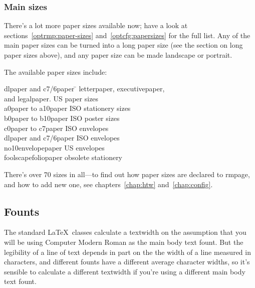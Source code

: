 \documentclass[11pt,loose,twoside,touchwider,longish,
                      noheaders,a4paper,notstdmargins]{report}
\DeclareRobustCommand*{\comname}[1]{{\ttfamily\makeatletter\bs #1\makeatother}}
\newcommand*{\classname}[1]{{\ttfamily #1}}
\newcommand*{\optname}[1]{{\ttfamily #1}}
\newcommand*{\rmpage}{\classname{rmpage}\xspace}
\begin{document}
\subsubsection{Main sizes}
\label{use:mainpapersizes}

There's a lot more paper sizes available now; have a look at
sections~\ref{optrmp:paper-sizes} and~\ref{optcfg:papersizes} for the
full list.  Any of the main paper sizes can be turned into a long paper
size (see the section on long paper sizes above), and any paper size
can be made landscape or portrait.

The available paper sizes include:
\begin{tabbing}
\optname{dlpaper} and \optname{c7/6paper} \= \kill
\optname{letterpaper}, \optname{executivepaper}, \\
and \optname{legalpaper}. \> US paper sizes \\
\optname{a0paper} to \optname{a10paper} \> ISO stationery sizes \\
\optname{b0paper} to \optname{b10paper} \> ISO poster sizes \\
\optname{c0paper} to \optname{c7paper} \> ISO envelopes \\
\optname{dlpaper} and \optname{c7/6paper} \> ISO envelopes \\
\optname{no10envelopepaper} \> US envelopes \\
\optname{foolscapefoliopaper} \> obsolete stationery \\
\end{tabbing}
There's over 70 sizes in all---to find out how paper sizes are
declared to \rmpage, and how to add new one, see chapters~\ref{chap:htw}
and~\ref{chap:config}.

\subsection{Founts}
\label{use:founts}

The standard \LaTeX\ classes calculate a \comname{textwidth} on the
assumption that you will be using  Computer Modern Roman  as the main
body text fount.  But the legibility of a line of text depends in
part on the the width of a line measured in characters, and
different founts have a different average character widths, so it's
sensible to calculate a different \comname{textwidth} if you're using
a different main body text fount.
\end{document}
